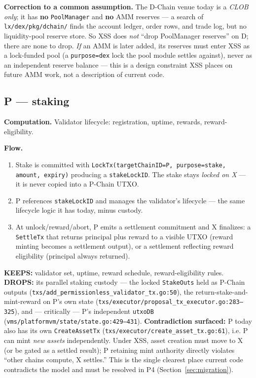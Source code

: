 \textbf{Correction to a common assumption.} The D-Chain venue today is
a \emph{CLOB only}; it has \textbf{no} \texttt{PoolManager} and \textbf{no}
AMM reserves --- a search of \texttt{lx/dex/pkg/dchain/} finds the
account ledger, order rows, and trade log, but no liquidity-pool
reserve store. So XSS does \emph{not} ``drop PoolManager reserves'' on
D; there are none to drop. \emph{If} an AMM is later added, its reserves
must enter XSS as a lock-funded pool (a \texttt{purpose=dex} lock the
pool module settles against), never as an independent reserve balance
--- this is a design constraint XSS places on future AMM work, not a
description of current code.

\subsection{P --- staking}

\textbf{Computation.} Validator lifecycle: registration, uptime,
rewards, reward-eligibility.

\textbf{Flow.}
\begin{enumerate}[leftmargin=2em,nosep]
\item Stake is committed with \texttt{LockTx(targetChainID=P,
  purpose=stake, amount, expiry)} producing a \texttt{stakeLockID}. The
  stake stays \emph{locked on X} --- it is never copied into a P-Chain
  UTXO.
\item P references \texttt{stakeLockID} and manages the validator's
  lifecycle --- the same lifecycle logic it has today, minus custody.
\item At unlock/reward/abort, P emits a settlement commitment and X
  finalizes: a \texttt{SettleTx} that returns principal plus reward to a
  visible UTXO (reward minting becomes a settlement output), or a
  settlement reflecting reward eligibility (principal always returned).
\end{enumerate}

\textbf{KEEPS:} validator set, uptime, reward schedule, reward-eligibility rules.
\textbf{DROPS:} its parallel staking custody --- the locked
\texttt{StakeOuts} held as P-Chain outputs
(\texttt{txs/add\_permissionless\_validator\_tx.go:50}), the
return-stake-and-mint-reward on P's own state
(\texttt{txs/executor/proposal\_tx\_executor.go:283--325}), and ---
critically --- P's independent \texttt{utxoDB}
(\texttt{vms/platformvm/state/state.go:429--431}). \textbf{Contradiction
surfaced:} P today also has its own \texttt{CreateAssetTx}
(\texttt{txs/executor/create\_asset\_tx.go:61}), i.e. P can mint
\emph{new assets} independently. Under XSS, asset creation must move to
X (or be gated as a settled result); P retaining mint authority directly
violates ``other chains compute, X settles.'' This is the single
clearest place current code contradicts the model and must be resolved
in P4 (Section~\ref{sec:migration}).

